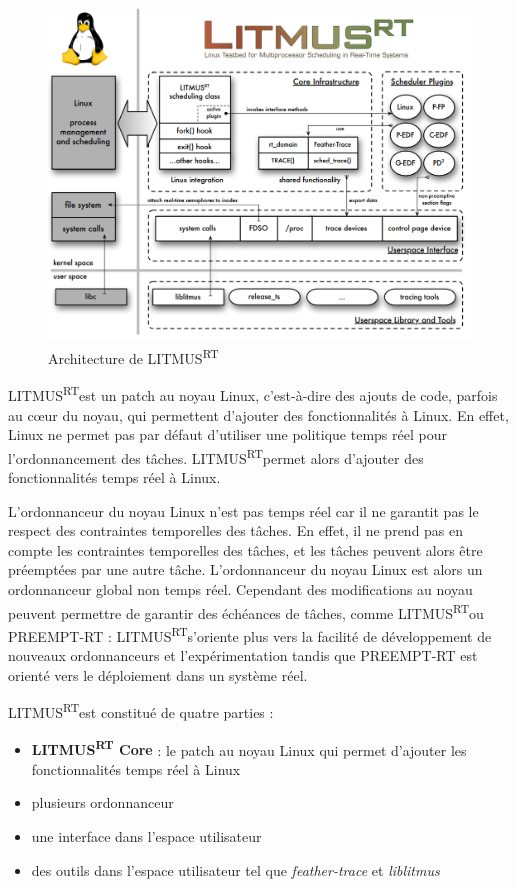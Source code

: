 \documentclass{article}
\newcommand{\litmus}{LITMUS\textsuperscript{RT}}
\begin{document}
\begin{figure}[H]
    \centering
    \includegraphics[width=0.5\paperwidth]{Images/litmusrtarchitecture.png}
    \caption{Architecture de \litmus}
    \label{fig:litmusrtarchitecture}
\end{figure}

    \litmus est un patch au noyau Linux, c'est-à-dire des ajouts de code, parfois au cœur du noyau, qui permettent d'ajouter des fonctionnalités à Linux. En effet, Linux ne permet pas par défaut d'utiliser une politique temps réel pour l'ordonnancement des tâches. \litmus permet alors d'ajouter des fonctionnalités temps réel à Linux.
    
    L'ordonnanceur du noyau Linux n'est pas temps réel car il ne garantit pas le respect des contraintes temporelles des tâches. En effet, il ne prend pas en compte les contraintes temporelles des tâches, et les tâches peuvent alors être préemptées par une autre tâche. L'ordonnanceur du noyau Linux est alors un ordonnanceur global non temps réel. Cependant des modifications au noyau peuvent permettre de garantir des échéances de tâches, comme \litmus ou PREEMPT-RT : \litmus s'oriente plus vers la facilité de développement de nouveaux ordonnanceurs et l'expérimentation tandis que PREEMPT-RT est orienté vers le déploiement dans un système réel.
    
    \litmus est constitué de quatre parties : 
    \begin{itemize}
        \item \textbf{LITMUS\textsuperscript{RT} Core} : le patch au noyau Linux qui permet d'ajouter les fonctionnalités temps réel à Linux
        \item plusieurs \gls{ordonnanceur}
        \item une interface dans l'espace utilisateur
        \item des outils dans l'espace utilisateur tel que \textit{feather-trace} et \textit{liblitmus}
    \end{itemize}
\end{document}
